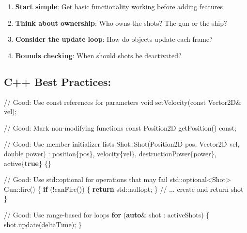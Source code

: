 \documentclass[
]{article}
\newenvironment{Shaded}{\begin{snugshade}}{\end{snugshade}}
\newcommand{\AttributeTok}[1]{\textcolor[rgb]{0.40,0.45,0.13}{#1}}
\newcommand{\BuiltInTok}[1]{\textcolor[rgb]{0.00,0.23,0.31}{#1}}
\newcommand{\CommentTok}[1]{\textcolor[rgb]{0.37,0.37,0.37}{#1}}
\newcommand{\ControlFlowTok}[1]{\textcolor[rgb]{0.00,0.23,0.31}{\textbf{#1}}}
\newcommand{\DataTypeTok}[1]{\textcolor[rgb]{0.68,0.00,0.00}{#1}}
\newcommand{\KeywordTok}[1]{\textcolor[rgb]{0.00,0.23,0.31}{\textbf{#1}}}
\newcommand{\NormalTok}[1]{\textcolor[rgb]{0.00,0.23,0.31}{#1}}
\newcommand{\OperatorTok}[1]{\textcolor[rgb]{0.37,0.37,0.37}{#1}}
\providecommand{\tightlist}{%
  \setlength{\itemsep}{0pt}\setlength{\parskip}{0pt}}
\begin{document}
\begin{enumerate}
\def\labelenumi{\arabic{enumi}.}
\tightlist
\item
  \textbf{Start simple}: Get basic functionality working before adding
  features
\item
  \textbf{Think about ownership}: Who owns the shots? The gun or the
  ship?
\item
  \textbf{Consider the update loop}: How do objects update each frame?
\item
  \textbf{Bounds checking}: When should shots be deactivated?
\end{enumerate}

\subsection{C++ Best Practices:}\label{c-best-practices}

\begin{Shaded}
\begin{Highlighting}[]
\CommentTok{// Good: Use const references for parameters}
\DataTypeTok{void}\NormalTok{ setVelocity}\OperatorTok{(}\AttributeTok{const}\NormalTok{ Vector2D}\OperatorTok{\&}\NormalTok{ vel}\OperatorTok{);}

\CommentTok{// Good: Mark non{-}modifying functions const}
\NormalTok{Position2D getPosition}\OperatorTok{()} \AttributeTok{const}\OperatorTok{;}

\CommentTok{// Good: Use member initializer lists}
\NormalTok{Shot}\OperatorTok{::}\NormalTok{Shot}\OperatorTok{(}\NormalTok{Position2D pos}\OperatorTok{,}\NormalTok{ Vector2D vel}\OperatorTok{,} \DataTypeTok{double}\NormalTok{ power}\OperatorTok{)}
    \OperatorTok{:}\NormalTok{ position}\OperatorTok{\{}\NormalTok{pos}\OperatorTok{\},}\NormalTok{ velocity}\OperatorTok{\{}\NormalTok{vel}\OperatorTok{\},}\NormalTok{ destructionPower}\OperatorTok{\{}\NormalTok{power}\OperatorTok{\},}\NormalTok{ active}\OperatorTok{\{}\KeywordTok{true}\OperatorTok{\}} \OperatorTok{\{\}}

\CommentTok{// Good: Use std::optional for operations that may fail}
\BuiltInTok{std::}\NormalTok{optional}\OperatorTok{\textless{}}\NormalTok{Shot}\OperatorTok{\textgreater{}}\NormalTok{ Gun}\OperatorTok{::}\NormalTok{fire}\OperatorTok{()} \OperatorTok{\{}
    \ControlFlowTok{if} \OperatorTok{(!}\NormalTok{canFire}\OperatorTok{())} \OperatorTok{\{}
        \ControlFlowTok{return} \BuiltInTok{std::}\NormalTok{nullopt}\OperatorTok{;}
    \OperatorTok{\}}
    \CommentTok{// ... create and return shot}
\OperatorTok{\}}

\CommentTok{// Good: Use range{-}based for loops}
\ControlFlowTok{for} \OperatorTok{(}\KeywordTok{auto}\OperatorTok{\&}\NormalTok{ shot }\OperatorTok{:}\NormalTok{ activeShots}\OperatorTok{)} \OperatorTok{\{}
\NormalTok{    shot}\OperatorTok{.}\NormalTok{update}\OperatorTok{(}\NormalTok{deltaTime}\OperatorTok{);}
\OperatorTok{\}}
\end{Highlighting}
\end{Shaded}
\end{document}
